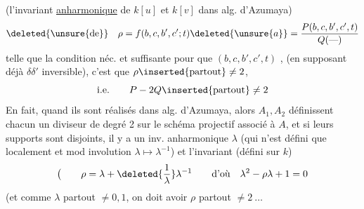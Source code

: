 (l'invariant \uline{anharmonique} de $k[u]$ et $k[v]$ dans alg. d'Azumaya)
\[ \deleted{\unsure{\text{de}}}\quad \rho=f(b,c,b',c';t)\deleted{\unsure{a}}=\frac{P(b,c,b',c',t)}{Q(\text{---})} \]
telle que la condition néc. et suffisante pour que $(b,c,b',c',t)$ ,  (en supposant déjà $\delta\delta'$ inversible), c'est que $\rho\inserted{\text{partout}}\ne2$,
\[ \text{i.e.}\qquad P-2Q\inserted{\text{partout}}\ne2 \]
En fait, quand ils sont réalisés dans alg. d'Azumaya,  alors $A_1,A_2$ définissent  chacun un diviseur de degré 2 sur  le schéma projectif associé à $A$, et si leurs supports sont disjoints, il y a un inv. anharmonique $\lambda$ (qui n'est défini que localement  et mod involution $\lambda\mapsto\lambda^{-1}$) et l'invariant (défini sur $k$)
\[ \bigl(\qquad \rho=\lambda+\deleted{\frac{1}{\lambda}}\lambda^{-1}\qquad \text{d'où}\quad \lambda^2-\rho\lambda+1=0 \]
(et comme $\lambda$ partout $\ne0,1$, on doit avoir $\rho$ partout $\ne2\ \ldots$
